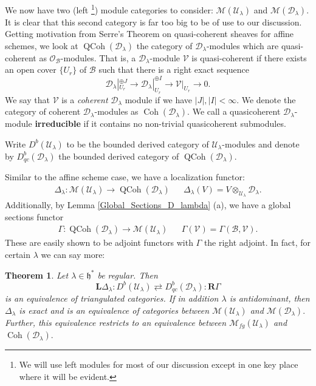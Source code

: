 \documentclass[letterpaper,twosided,11pt]{article}
\theoremstyle{plain}
\newtheorem{theorem}{Theorem}[section]
\theoremstyle{definition}
\theoremstyle{remark}
\newcommand{\script}[1]{\mathscr{#1}}
\newcommand{\ds}{\oplus}
\newcommand{\tensor}{\otimes}
\newcommand{\lie}[1]{\mathfrak{#1}}
\begin{document}
We now have two (left%
\footnote{We will use left modules for most of our discussion except in
one key place where it will be evident.}) module categories to consider:
$ \mathcal{M}(\mathcal{U}_\lambda) $ and $ \mathcal{M}(\mathcal{D}_\lambda).
$ It is clear that this second category is far too big to be of use to
our discussion.  Getting motivation from Serre's Theorem on
quasi-coherent sheaves for affine schemes, we look at $
\operatorname{QCoh}
(\mathcal{D}_\lambda) $ the category of $ \mathcal{D}_\lambda $-modules
which are quasi-coherent as $ \mathcal{O}_\mathcal{B} $-modules.  That
is, a $ \mathcal{D}_\lambda $-module $ \script{V} $ is quasi-coherent if
there exists an open cover $ \{U_r\} $ of $ \mathcal{B} $ such that
there is a right exact sequence
\[
    \mathcal{D}_\lambda|_{U_r}^{\ds J }\to \mathcal{D}_\lambda|_{U_r}^{\ds
    I}\to \script{V}|_{U_r}\to 0.
\]
We say that $ \script{V} $ is a \textit{coherent} $ \mathcal{D}_\lambda $
module if we have $ |J|,|I|<\infty. $ We denote the category of coherent
$ \mathcal{D}_\lambda $-modules as $
\operatorname{Coh}
(\mathcal{D}_\lambda). $ We call a quasicoherent $ \mathcal{D}_\lambda $-module
\textbf{irreducible} if it contains no non-trivial quasicoherent
submodules.

Write $ D^b(\mathcal{U}_\lambda) $ to be the bounded derived category of
$ \mathcal{U}_\lambda $-modules and denote by $ D^b_{qc}(\mathcal{D}_\lambda)
$ the bounded derived category of $
\operatorname{QCoh}
(\mathcal{D}_\lambda). $

Similar to the affine scheme case, we have a localization functor:
\begin{align*}
    \Delta_\lambda:\mathcal{M}(\mathcal{U}_\lambda)\to
    \operatorname{QCoh}
    (\mathcal{D}_\lambda)&& \Delta_\lambda(V)=V\tensor_{\mathcal{U}_\lambda}\mathcal
    {D}_\lambda.
\end{align*}
Additionally, by Lemma \ref{Global_Sections_D_lambda} (a), we have a
global sections functor
\begin{align*}
    \Gamma:
    \operatorname{QCoh}
    (\mathcal{D}_\lambda)\to \mathcal{M}(\mathcal{U}_\lambda)&& \Gamma(\script
    {V})=\Gamma(\mathcal{B},\script{V}).
\end{align*}
These are easily shown to be adjoint functors with $ \Gamma $ the right
adjoint.  In fact, for certain $ \lambda $ we can say more:

\begin{theorem}
    \cite{BeilinsonBernstein1981} Let $ \lambda\in\lie{h}^* $ be
    regular.  Then
    \[
        \textbf{L}\Delta_\lambda:  D^b(\mathcal{U}_\lambda)
        \rightleftarrows D^b_{qc}(\mathcal{D}_\lambda):\textbf{R}\Gamma
    \]
    is an equivalence of triangulated categories.  If in addition $
    \lambda $ is antidominant, then $ \Delta_\lambda $ is exact and is
    an equivalence of categories between $ \mathcal{M}(\mathcal{U}_\lambda)
    $ and $ \mathcal{M}(\mathcal{D}_\lambda). $ Further, this
    equivalence restricts to an equivalence between $ \mathcal{M}_{fg}(\mathcal
    {U}_\lambda) $ and $
    \operatorname{Coh}
    (\mathcal{D}_\lambda). $
\end{theorem}
\end{document}
